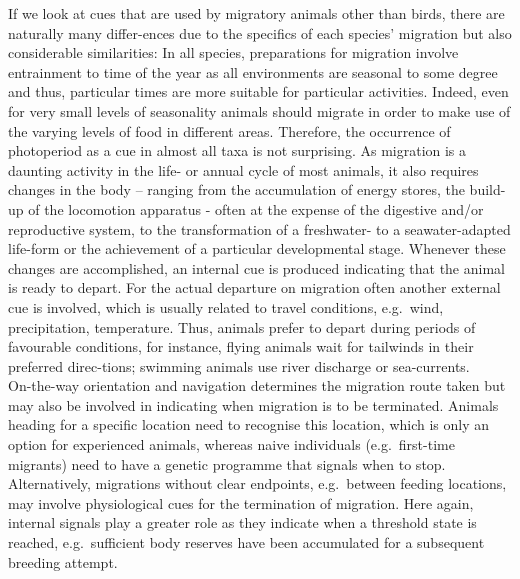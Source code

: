 \documentclass[
]{book}
\begin{document}
If we look at cues that are used by migratory animals other than birds, there are naturally many differ-ences due to the specifics of each species' migration but also considerable similarities: In all species, preparations for migration involve entrainment to time of the year as all environments are seasonal to some degree and thus, particular times are more suitable for particular activities. Indeed, even for very small levels of seasonality animals should migrate in order to make use of the varying levels of food in different areas. Therefore, the occurrence of photoperiod as a cue in almost all taxa is not surprising.
As migration is a daunting activity in the life- or annual cycle of most animals, it also requires changes in the body -- ranging from the accumulation of energy stores, the build-up of the locomotion apparatus - often at the expense of the digestive and/or reproductive system, to the transformation of a freshwater- to a seawater-adapted life-form or the achievement of a particular developmental stage. Whenever these changes are accomplished, an internal cue is produced indicating that the animal is ready to depart.
For the actual departure on migration often another external cue is involved, which is usually related to travel conditions, e.g.~wind, precipitation, temperature. Thus, animals prefer to depart during periods of favourable conditions, for instance, flying animals wait for tailwinds in their preferred direc-tions; swimming animals use river discharge or sea-currents.\\
On-the-way orientation and navigation determines the migration route taken but may also be involved in indicating when migration is to be terminated. Animals heading for a specific location need to recognise this location, which is only an option for experienced animals, whereas naive individuals (e.g.~first-time migrants) need to have a genetic programme that signals when to stop. Alternatively, migrations without clear endpoints, e.g.~between feeding locations, may involve physiological cues for the termination of migration. Here again, internal signals play a greater role as they indicate when a threshold state is reached, e.g.~sufficient body reserves have been accumulated for a subsequent breeding attempt.
\end{document}
